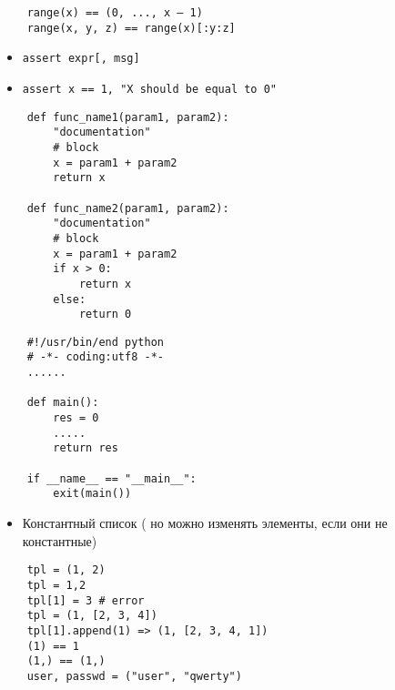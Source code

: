 \documentclass{article}
\begin{document}
\vspace{15pt}
\begin{lstlisting}
    range(x) == (0, ..., x – 1)
    range(x, y, z) == range(x)[:y:z]
\end{lstlisting}
\newpage

\begin{itemize}
    \item \lstinline!assert expr[, msg]!
    \item \lstinline!assert x == 1, "X should be equal to 0"!
\end{itemize}
\newpage

\begin{lstlisting}
    def func_name1(param1, param2):
        "documentation"
        # block
        x = param1 + param2
        return x

    def func_name2(param1, param2):
        "documentation"
        # block
        x = param1 + param2
        if x > 0:
            return x
        else:
            return 0
\end{lstlisting}
\newpage

\begin{lstlisting}
    #!/usr/bin/end python
    # -*- coding:utf8 -*-
    ......

    def main():
        res = 0
        .....
        return res

    if __name__ == "__main__":
        exit(main())
\end{lstlisting}
\newpage


\begin{itemize}
    \item Константный список ( но можно изменять элементы, если они не константные)
\end{itemize}
\vspace{15pt}
\begin{lstlisting}
    tpl = (1, 2)
    tpl = 1,2
    tpl[1] = 3 # error
    tpl = (1, [2, 3, 4])
    tpl[1].append(1) => (1, [2, 3, 4, 1])
    (1) == 1
    (1,) == (1,)
    user, passwd = ("user", "qwerty") 
\end{lstlisting}
\newpage
\end{document}
